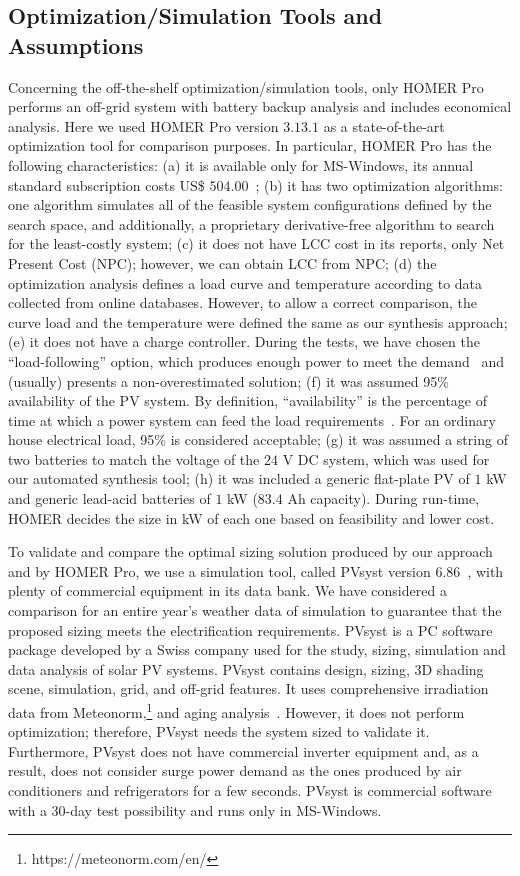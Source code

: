 \documentclass[10pt,journal,compsoc]{IEEEtran}
\begin{document}
\subsection{Optimization/Simulation Tools and Assumptions}
Concerning the off-the-shelf optimization/simulation tools, only HOMER Pro performs an off-grid system with battery backup analysis and includes economical analysis. Here we used HOMER Pro version $3.13.1$ as a state-of-the-art optimization tool for comparison purposes. In particular, HOMER Pro has the following characteristics:
(a) it is available only for MS-Windows, its annual standard subscription costs US\$ $504.00$~\cite{HOMER}; 
(b) it has two optimization algorithms: one algorithm simulates all of the feasible system configurations defined by the search space, and additionally, a proprietary derivative-free algorithm to search for the least-costly system;
(c) it does not have LCC cost in its reports, only Net Present Cost (NPC); however, we can obtain LCC from NPC; 
(d) the optimization analysis defines a load curve and temperature according to data collected from online databases. However, to allow a correct comparison, the curve load and the temperature were defined the same as our synthesis approach; 
(e) it does not have a charge controller. During the tests, we have chosen the ``load-following'' option, which produces enough power to meet the demand~\cite{HOMER} and (usually) presents a non-overestimated solution; 
(f) it was assumed 95\% availability of the PV system. By definition, ``availability'' is the percentage of time at which a power system can feed the load requirements~\cite{Khatib2014}. For an ordinary house electrical load, 95\% is considered acceptable;
(g) it was assumed a string of two batteries to match the voltage of the $24$ V DC system, which was used for our automated synthesis tool; 
(h) it was included a generic flat-plate PV of $1$ kW and generic lead-acid batteries of $1$ kW ($83.4$ Ah capacity). During run-time, HOMER decides the size in kW of each one based on feasibility and lower cost.

To validate and compare the optimal sizing solution produced by our approach and by HOMER Pro, we use a simulation tool, called PVsyst version $6.86$~\cite{PVsyst}, with plenty of commercial equipment in its data bank. We have considered a comparison for an entire year's weather data of simulation to guarantee that the proposed sizing meets the electrification requirements. PVsyst is a PC software package developed by a Swiss company used for the study, sizing, simulation and data analysis of solar PV systems. PVsyst contains design, sizing, 3D shading scene, simulation, grid, and off-grid features. It uses comprehensive irradiation data from Meteonorm,\footnote{https://meteonorm.com/en/} and aging analysis~\cite{PVsyst2017}. However, it does not perform optimization; therefore, PVsyst needs the system sized to validate it. Furthermore, PVsyst does not have commercial inverter equipment and, as a result, does not consider surge power demand as the ones produced by air conditioners and refrigerators for a few seconds. PVsyst is commercial software with a $30$-day test possibility and runs only in MS-Windows.
\end{document}
